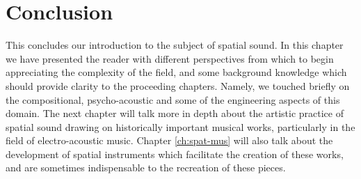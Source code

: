 

\section{Conclusion}

This concludes our introduction to the subject of spatial sound. In this chapter we have presented the reader with different perspectives from which to begin appreciating the complexity of the field, and some background knowledge which should provide clarity to the proceeding chapters. Namely, we touched briefly on the compositional, psycho-acoustic and some of the engineering aspects of this domain. The next chapter will talk more in depth about the artistic practice of spatial sound drawing on historically important musical works, particularly in the field of electro-acoustic music. Chapter \ref{ch:spat-mus} will also talk about the development of spatial instruments which facilitate the creation of these works, and are sometimes indispensable to the recreation of these pieces.